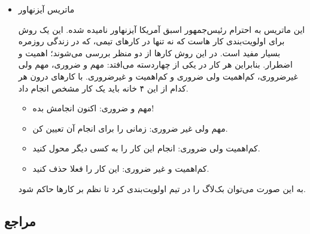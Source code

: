 {\begin{itemize}
    \item ماتریس آیزنهاور

 این ماتریس به احترام رئیس‌جمهور اسبق آمریکا آیزنهاور نامیده شده. این یک روش برای اولویت‌بندی کار هاست که نه تنها در کارهای تیمی، که در زندگی روزمره بسیار مفید است. در این روش کار‌ها از دو منظر بررسی می‌شوند؛ اهمیت و اضطرار. بنابراین هر کار در یکی از چهاردسته می‌افتد: مهم و ضروری، مهم ولی غیرضروری، کم‌اهمیت ولی ضروری و کم‌اهمیت و غیرضروری. با کار‌های درون هر کدام از این ۴ خانه باید یک کار مشخص انجام داد.
    \begin{itemize}
        \item مهم و ضروری: اکنون انجامش بده!
        \item مهم ولی غیر ضروری: زمانی را برای انجام آن تعیین کن.
        \item کم‌اهمیت ولی ضروری: انجام این کار را به کسی دیگر محول کنید.
        \item کم‌اهمیت و غیر ضروری: این کار را فعلا حذف کنید.
    \end{itemize}
    به این صورت می‌توان بک‌لاگ را در تیم اولویت‌بندی کرد تا نظم بر کارها حاکم شود.
\end{itemize}

}

\subsection*{مراجع}

